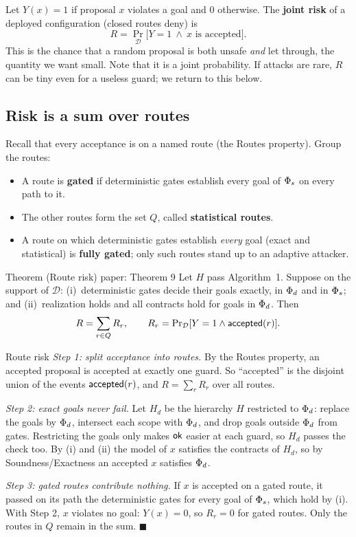 Let $Y(x)=1$ if proposal $x$ violates a goal and $0$ otherwise. The \textbf{joint risk} of a deployed configuration (closed routes deny) is
\[
R=\Pr_{\mathcal D}\bigl[Y=1\ \wedge\ x\text{ is accepted}\bigr].
\]
This is the chance that a random proposal is both unsafe \emph{and} let through, the quantity we want small. Note that it is a joint probability. If attacks are rare, $R$ can be tiny even for a useless guard; we return to this below.

\subsection{Risk is a sum over routes}

Recall that every acceptance is on a named route (the Routes property). Group the routes:

\begin{itemize}
\item A route is \textbf{gated} if deterministic gates establish every goal of $\Phi_s$ on every path to it.
\item The other routes form the set $Q$, called \textbf{statistical routes}.
\item A route on which deterministic gates establish \emph{every} goal (exact and statistical) is \textbf{fully gated}; only such routes stand up to an adaptive attacker.
\end{itemize}

\begin{statement}{Theorem (Route risk) \hfill\normalfont paper: Theorem 9}
Let $H$ pass Algorithm~1. Suppose on the support of $\mathcal D$: (i)~deterministic gates decide their goals exactly, in $\Phi_d$ and in $\Phi_s$; and (ii)~realization holds and all contracts hold for goals in $\Phi_d$. Then
\[
R=\sum_{r\in Q}R_r,\qquad R_r=\mathrm{Pr}_{\mathcal D}[Y=1\wedge\mathsf{accepted}(r)].
\]
\end{statement}

\begin{plainproof}{Route risk}
\emph{Step 1: split acceptance into routes.} By the Routes property, an accepted proposal is accepted at exactly one guard. So ``accepted'' is the disjoint union of the events $\mathsf{accepted}(r)$, and $R=\sum_rR_r$ over all routes.

\emph{Step 2: exact goals never fail.} Let $H_d$ be the hierarchy $H$ restricted to $\Phi_d$: replace the goals by $\Phi_d$, intersect each scope with $\Phi_d$, and drop goals outside $\Phi_d$ from gates. Restricting the goals only makes $\mathsf{ok}$ easier at each guard, so $H_d$ passes the check too. By (i) and (ii) the model of $x$ satisfies the contracts of $H_d$, so by Soundness/Exactness an accepted $x$ satisfies $\Phi_d$.

\emph{Step 3: gated routes contribute nothing.} If $x$ is accepted on a gated route, it passed on its path the deterministic gates for every goal of $\Phi_s$, which hold by (i). With Step 2, $x$ violates no goal: $Y(x)=0$, so $R_r=0$ for gated routes. Only the routes in $Q$ remain in the sum. \hfill$\blacksquare$
\end{plainproof}

